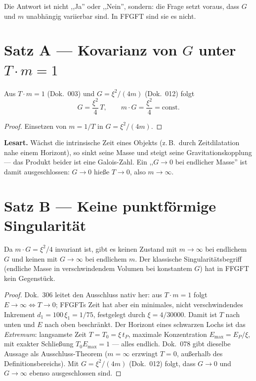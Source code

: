 Die Antwort ist nicht ,,Ja'' oder ,,Nein'', sondern: die Frage setzt
voraus, dass $G$ und $m$ unabhängig variierbar sind. In FFGFT sind sie es
nicht.

\section{Satz A --- Kovarianz von $G$ unter $T\cdot m=1$}

\begin{theorem}
Aus $T\cdot m=1$ (Dok.~003) und $G=\xi^2/(4m)$ (Dok.~012) folgt
\[
  G = \frac{\xi^2}{4}\,T, \qquad m\cdot G = \frac{\xi^2}{4}=\text{const.}
\]
\end{theorem}

\begin{proof}
Einsetzen von $m=1/T$ in $G=\xi^2/(4m)$.
\end{proof}

\textbf{Lesart.} Wächst die intrinsische Zeit eines Objekts (z.\,B.\ durch
Zeitdilatation nahe einem Horizont), so sinkt seine Masse und steigt seine
Gravitationskopplung --- das Produkt beider ist eine Galois-Zahl. Ein
,,$G\to0$ bei endlicher Masse'' ist damit ausgeschlossen: $G\to0$ hieße
$T\to0$, also $m\to\infty$.

\section{Satz B --- Keine punktförmige Singularität}

\begin{theorem}
Da $m\cdot G=\xi^2/4$ invariant ist, gibt es keinen Zustand mit
$m\to\infty$ bei endlichem $G$ und keinen mit $G\to\infty$ bei endlichem
$m$. Der klassische Singularitätsbegriff (endliche Masse in verschwindendem
Volumen bei konstantem $G$) hat in FFGFT kein Gegenstück.
\end{theorem}

\begin{proof}
Dok.~306 leitet den Ausschluss nativ her: aus $T\cdot m=1$ folgt
$E\to\infty\Leftrightarrow T\to0$; FFGFTs Zeit hat aber ein minimales,
nicht verschwindendes Inkrement $d_1=100\,\xi_1=1/75$, festgelegt durch
$\xi=4/30000$. Damit ist $T$ nach unten und $E$ nach oben beschränkt.
Der Horizont eines schwarzen Lochs ist das \emph{Extremum}: langsamste
Zeit $T=T_0=\xi\,t_P$, maximale Konzentration $E_\text{max}=E_P/\xi$, mit
exakter Schließung $T_0E_\text{max}=1$ --- alles endlich. Dok.~078 gibt
dieselbe Aussage als Ausschluss-Theorem ($m=\infty$ erzwingt $T=0$,
außerhalb des Definitionsbereichs). Mit $G=\xi^2/(4m)$ (Dok.~012) folgt,
dass $G\to0$ und $G\to\infty$ ebenso ausgeschlossen sind.
\end{proof}

